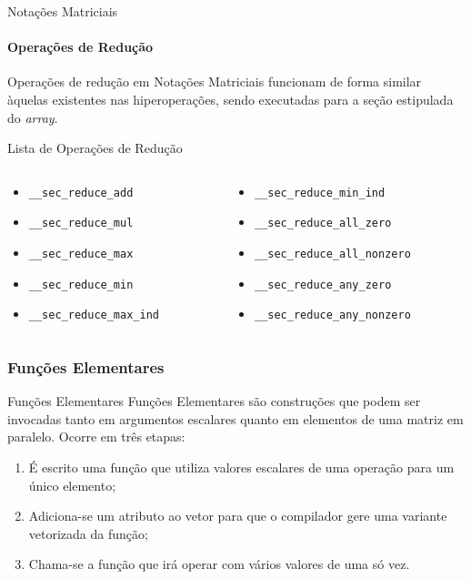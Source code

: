 \documentclass{beamer}
\begin{document}
\begin{frame}[fragile]{Notações Matriciais}
\framesubtitle{Operações de Redução}
	Operações de redução em Notações Matriciais funcionam de forma similar
	àquelas existentes nas hiperoperações, sendo executadas para a seção
	estipulada do \textit{array}.
\begin{block}{Lista de Operações de Redução}
\begin{small}
\begin{small}
\begin{columns}
\begin{column}{0.45\textwidth}
\begin{itemize}
    \item \texttt{\_\_sec\_reduce\_add}
    \item \texttt{\_\_sec\_reduce\_mul}
    \item \texttt{\_\_sec\_reduce\_max}
    \item \texttt{\_\_sec\_reduce\_min}
    \item \texttt{\_\_sec\_reduce\_max\_ind}
\end{itemize}
\end{column}
\begin{column}{0.45\textwidth}
\begin{itemize}
    \item \texttt{\_\_sec\_reduce\_min\_ind}
    \item \texttt{\_\_sec\_reduce\_all\_zero}
    \item \texttt{\_\_sec\_reduce\_all\_nonzero}
    \item \texttt{\_\_sec\_reduce\_any\_zero}
    \item \texttt{\_\_sec\_reduce\_any\_nonzero}
\end{itemize}
\end{column}
\end{columns}
\end{small}
\end{small}
\end{block}
\end{frame}

\subsubsection{Funções Elementares}
\begin{frame}{Funções Elementares}
    Funções Elementares são construções que podem ser invocadas tanto em argumentos escalares quanto em elementos de uma matriz em paralelo.
    Ocorre em três etapas:
\begin{enumerate}
    \item É escrito uma função que utiliza valores escalares de uma operação para um único elemento;
\pause
    \item Adiciona-se um atributo ao vetor para que o compilador gere uma variante vetorizada da função;
\pause
    \item Chama-se a função que irá operar com vários valores de uma só vez.
\end{enumerate}

\end{frame}
\end{document}
